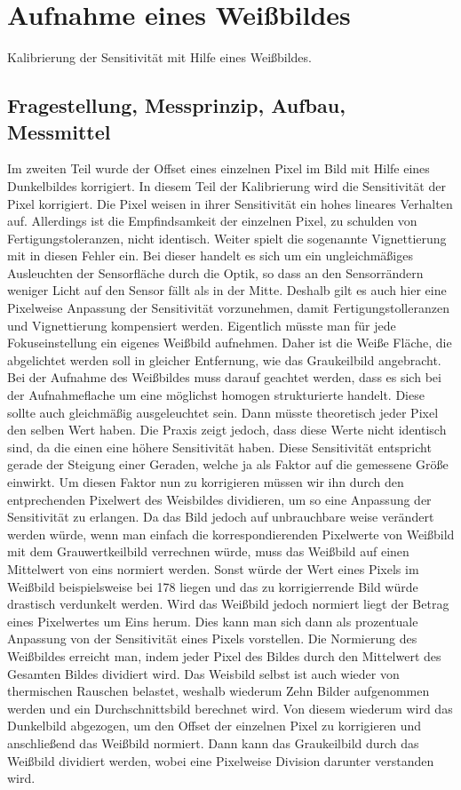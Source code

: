 %
%
\chapter{Aufnahme eines Weißbildes}
\label{chap:VERSUCH_3}
Kalibrierung der Sensitivität mit Hilfe eines Weißbildes.
\section{Fragestellung, Messprinzip, Aufbau, Messmittel}
\label{chap:VERSUCH_3_FRAGESTELLUNG}
Im zweiten Teil wurde der Offset eines einzelnen Pixel im Bild mit Hilfe eines Dunkelbildes korrigiert. In diesem Teil der Kalibrierung wird die Sensitivität der Pixel korrigiert. Die Pixel weisen in ihrer Sensitivität ein hohes lineares Verhalten auf. Allerdings ist die Empfindsamkeit der einzelnen Pixel, zu schulden von Fertigungstoleranzen, nicht identisch. Weiter spielt die sogenannte Vignettierung mit in diesen Fehler ein. Bei dieser handelt es sich um ein ungleichmäßiges Ausleuchten der Sensorfläche durch die Optik, so dass an den Sensorrändern weniger Licht auf den Sensor fällt als in der Mitte. Deshalb gilt es auch hier eine Pixelweise Anpassung der Sensitivität vorzunehmen, damit Fertigungstolleranzen und Vignettierung kompensiert werden. Eigentlich müsste man für jede Fokuseinstellung ein eigenes Weißbild aufnehmen. Daher ist die Weiße Fläche, die abgelichtet werden soll in gleicher Entfernung, wie das Graukeilbild angebracht. 
Bei der Aufnahme des Weißbildes muss darauf geachtet werden, dass es sich bei der Aufnahmeflache um eine möglichst homogen strukturierte handelt. Diese sollte auch gleichmäßig ausgeleuchtet sein.
Dann müsste theoretisch jeder Pixel den selben Wert haben. Die Praxis zeigt jedoch, dass diese Werte nicht identisch sind, da die einen eine höhere Sensitivität haben. Diese Sensitivität entspricht gerade der Steigung einer Geraden, welche ja als Faktor auf die gemessene Größe einwirkt. Um diesen Faktor nun zu korrigieren müssen wir ihn durch den entprechenden Pixelwert des Weisbildes dividieren, um so eine Anpassung der Sensitivität zu erlangen. Da das Bild jedoch auf unbrauchbare weise verändert werden würde, wenn man einfach die korrespondierenden Pixelwerte von Weißbild mit dem Grauwertkeilbild verrechnen würde, muss das Weißbild auf einen Mittelwert von eins normiert werden. Sonst würde der Wert eines Pixels im Weißbild beispielsweise bei 178 liegen und das zu korrigierrende Bild würde drastisch verdunkelt werden. Wird das Weißbild jedoch normiert liegt der Betrag eines Pixelwertes um Eins herum. Dies kann man sich dann als prozentuale Anpassung von der Sensitivität eines Pixels vorstellen. Die Normierung des Weißbildes erreicht man, indem jeder Pixel des Bildes durch den Mittelwert des Gesamten Bildes dividiert wird.
Das Weisbild selbst ist auch wieder von thermischen Rauschen belastet, weshalb wiederum Zehn Bilder aufgenommen werden und ein Durchschnittsbild berechnet wird. Von diesem wiederum wird das Dunkelbild abgezogen, um den Offset der einzelnen Pixel zu korrigieren und anschließend das Weißbild normiert.
Dann kann das Graukeilbild durch das Weißbild dividiert werden, wobei eine Pixelweise Division darunter verstanden wird.

